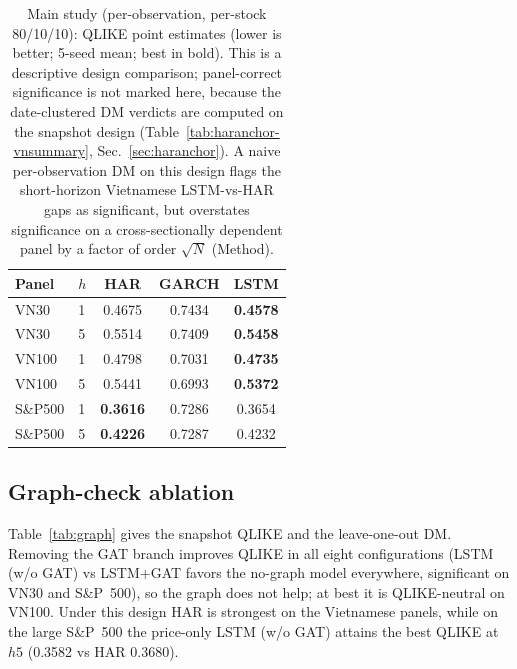 \documentclass[runningheads]{llncs}
\begin{document}
\begin{table}[t]
\centering
\caption{Main study (per-observation, per-stock 80/10/10): QLIKE point estimates (lower is better; 5-seed
mean; best in bold). This is a descriptive design comparison; panel-correct significance is not marked here,
because the date-clustered DM verdicts are computed on the snapshot design (Table~\ref{tab:haranchor-vnsummary},
Sec.~\ref{sec:haranchor}). A naive per-observation DM on this design flags the short-horizon Vietnamese
LSTM-vs-HAR gaps as significant, but overstates significance on a cross-sectionally dependent panel by a factor
of order $\sqrt{N}$ (Method).}
\label{tab:main}
\begin{tabular}{llccc}
\toprule
Panel & $h$ & HAR & GARCH & LSTM \\
\midrule
VN30   & 1 & 0.4675 & 0.7434 & \textbf{0.4578} \\
VN30   & 5 & 0.5514 & 0.7409 & \textbf{0.5458} \\
VN100  & 1 & 0.4798 & 0.7031 & \textbf{0.4735} \\
VN100  & 5 & 0.5441 & 0.6993 & \textbf{0.5372} \\
S\&P500& 1 & \textbf{0.3616} & 0.7286 & 0.3654 \\
S\&P500& 5 & \textbf{0.4226} & 0.7287 & 0.4232 \\
\bottomrule
\end{tabular}
\end{table}

\subsection{Graph-check ablation}
Table~\ref{tab:graph} gives the snapshot QLIKE and the leave-one-out DM. Removing the GAT branch improves
QLIKE in all eight configurations (LSTM (w/o GAT) vs LSTM+GAT favors the no-graph model everywhere,
significant on VN30 and S\&P~500), so the graph does not help; at best it is QLIKE-neutral on VN100. Under
this design HAR is strongest on the Vietnamese panels, while on the large S\&P~500 the price-only LSTM (w/o
GAT) attains the best QLIKE at $h5$ (0.3582 vs HAR 0.3680).
\end{document}
